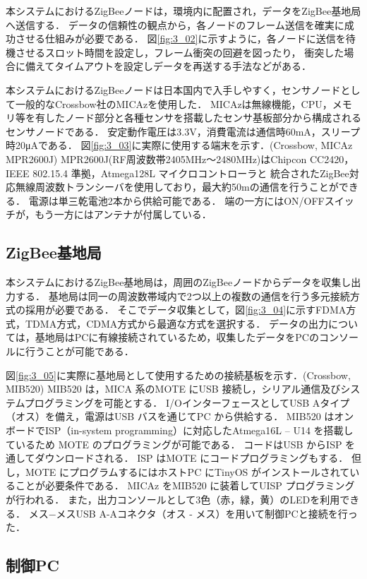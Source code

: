 \documentclass[12pt]{jreport}
\begin{document}
本システムにおけるZigBeeノードは，環境内に配置され，データをZigBee基地局へ送信する．
データの信頼性の観点から，各ノードのフレーム送信を確実に成功させる仕組みが必要である．
図\ref{fig:3_02}に示すように，各ノードに送信を待機させるスロット時間を設定し，フレーム衝突の回避を図ったり，
衝突した場合に備えてタイムアウトを設定しデータを再送する手法などがある．

本システムにおけるZigBeeノードは日本国内で入手しやすく，センサノードとして一般的なCrossbow社のMICAzを使用した．
MICAzは無線機能，CPU，メモリ等を有したノード部分と各種センサを搭載したセンサ基板部分から構成されるセンサノードである．
安定動作電圧は3.3V，消費電流は通信時60mA，スリープ時20μAである．
図\ref{fig:3_03}に実際に使用する端末を示す．(Crossbow, MICAz MPR2600J)
MPR2600J(RF周波数帯2405MHz～2480MHz)はChipcon CC2420，IEEE 802.15.4 準拠，Atmega128L マイクロコントローラと
統合されたZigBee対応無線周波数トランシーバを使用しており，最大約50mの通信を行うことができる．
電源は単三乾電池2本から供給可能である．
端の一方にはON/OFFスイッチが，もう一方にはアンテナが付属している．

\subsection{ZigBee基地局}

本システムにおけるZigBee基地局は，周囲のZigBeeノードからデータを収集し出力する．
基地局は同一の周波数帯域内で2つ以上の複数の通信を行う多元接続方式の採用が必要である．
そこでデータ収集として，図\ref{fig:3_04}に示すFDMA方式，TDMA方式，CDMA方式から最適な方式を選択する．
データの出力については，基地局はPCに有線接続されているため，収集したデータをPCのコンソールに行うことが可能である．

図\ref{fig:3_05}に実際に基地局として使用するための接続基板を示す．(Crossbow, MIB520)
MIB520 は，MICA 系のMOTE にUSB 接続し，シリアル通信及びシステムプログラミングを可能とする．
I/OインターフェースとしてUSB Aタイプ（オス）を備え，電源はUSB バスを通じてPC から供給する．
MIB520 はオンボードでISP（in-system programming）に対応したAtmega16L – U14 を搭載しているため
MOTE のプログラミングが可能である．
コードはUSB からISP を通してダウンロードされる．
ISP はMOTE にコードプログラミングもする．
但し，MOTE にプログラムするにはホストPC にTinyOS がインストールされていることが必要条件である．
MICAz をMIB520 に装着してUISP プログラミングが行われる．
また，出力コンソールとして3色（赤，緑，黄）のLEDを利用できる．
メス−メスUSB A-Aコネクタ（オス - メス）を用いて制御PCと接続を行った．

\subsection{制御PC}
\end{document}
